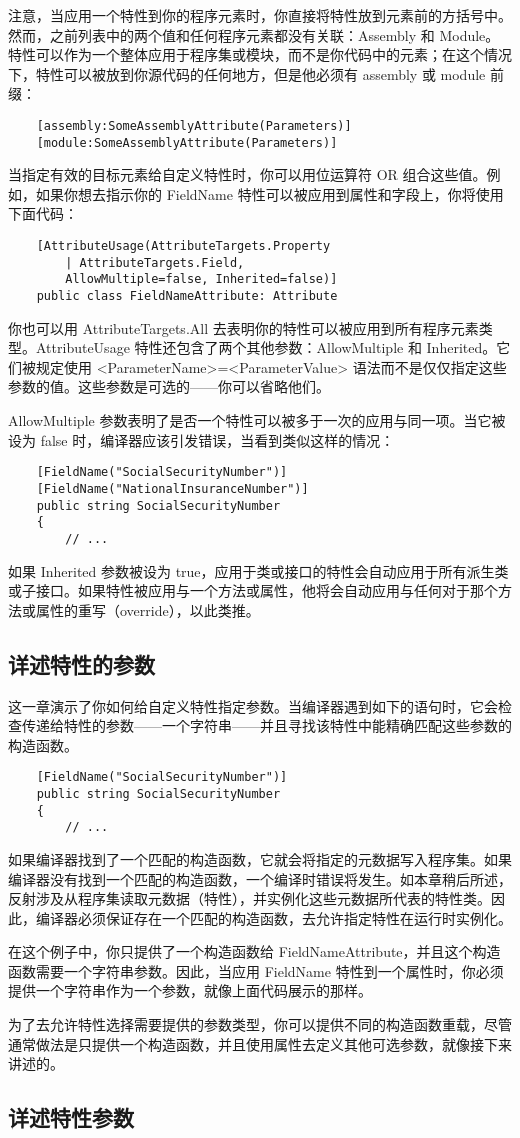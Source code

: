 注意，当应用一个特性到你的程序元素时，你直接将特性放到元素前的方括号中。然而，之前列表中的两个值和任何程序元素都没有关联：Assembly 和 Module。特性可以作为一个整体应用于程序集或模块，而不是你代码中的元素；在这个情况下，特性可以被放到你源代码的任何地方，但是他必须有 assembly 或 module 前缀：
\begin{verbatim}
    [assembly:SomeAssemblyAttribute(Parameters)]
    [module:SomeAssemblyAttribute(Parameters)]
\end{verbatim}
当指定有效的目标元素给自定义特性时，你可以用位运算符 OR 组合这些值。例如，如果你想去指示你的 FieldName 特性可以被应用到属性和字段上，你将使用下面代码：
\begin{verbatim}
    [AttributeUsage(AttributeTargets.Property
        | AttributeTargets.Field,
        AllowMultiple=false, Inherited=false)]
    public class FieldNameAttribute: Attribute
\end{verbatim}
你也可以用 AttributeTargets.All 去表明你的特性可以被应用到所有程序元素类型。AttributeUsage 特性还包含了两个其他参数：AllowMultiple 和 Inherited。它们被规定使用 <ParameterName>=<ParameterValue> 语法而不是仅仅指定这些参数的值。这些参数是可选的——你可以省略他们。

AllowMultiple 参数表明了是否一个特性可以被多于一次的应用与同一项。当它被设为 false 时，编译器应该引发错误，当看到类似这样的情况：
\begin{verbatim}
    [FieldName("SocialSecurityNumber")]
    [FieldName("NationalInsuranceNumber")]
    public string SocialSecurityNumber
    {
        // ...
\end{verbatim}
如果 Inherited 参数被设为 true，应用于类或接口的特性会自动应用于所有派生类或子接口。如果特性被应用与一个方法或属性，他将会自动应用与任何对于那个方法或属性的重写（override），以此类推。

\subsection{详述特性的参数}
这一章演示了你如何给自定义特性指定参数。当编译器遇到如下的语句时，它会检查传递给特性的参数——一个字符串——并且寻找该特性中能精确匹配这些参数的构造函数。
\begin{verbatim}
    [FieldName("SocialSecurityNumber")]
    public string SocialSecurityNumber
    {
        // ...
\end{verbatim}
如果编译器找到了一个匹配的构造函数，它就会将指定的元数据写入程序集。如果编译器没有找到一个匹配的构造函数，一个编译时错误将发生。如本章稍后所述，反射涉及从程序集读取元数据（特性），并实例化这些元数据所代表的特性类。因此，编译器必须保证存在一个匹配的构造函数，去允许指定特性在运行时实例化。

在这个例子中，你只提供了一个构造函数给 FieldNameAttribute，并且这个构造函数需要一个字符串参数。因此，当应用 FieldName 特性到一个属性时，你必须提供一个字符串作为一个参数，就像上面代码展示的那样。

为了去允许特性选择需要提供的参数类型，你可以提供不同的构造函数重载，尽管通常做法是只提供一个构造函数，并且使用属性去定义其他可选参数，就像接下来讲述的。

\subsection{详述特性参数}
